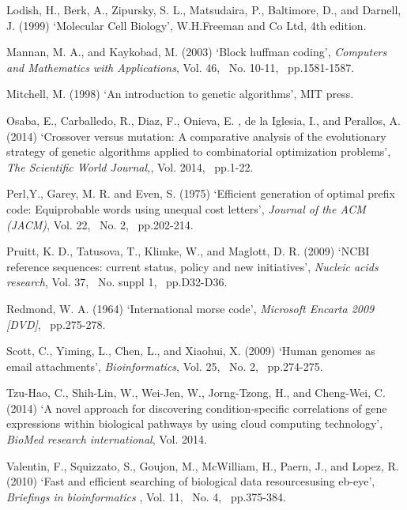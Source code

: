 \documentclass{singlecol-new}
\theoremstyle{TH}{
\newtheorem{lemma}{Lemma}
\newtheorem{theorem}[lemma]{Theorem}
\newtheorem{corrolary}[lemma]{Corrolary}
\newtheorem{conjecture}[lemma]{Conjecture}
\newtheorem{proposition}[lemma]{Proposition}
\newtheorem{claim}[lemma]{Claim}
\newtheorem{stheorem}[lemma]{Wrong Theorem}
}
\theoremstyle{THrm}{
\newtheorem{definition}{Definition}
\newtheorem{question}{Question}
\newtheorem{remark}{Remark}
\newtheorem{scheme}{Scheme}
}
\theoremstyle{THhit}{
\newtheorem{case}{Case}[section]
}
\begin{document}
\begin{thebibliography}{99}
Lodish, H., Berk, A., Zipursky, S. L., Matsudaira, P.,   Baltimore, D., and  Darnell, J. (1999) `Molecular Cell Biology', W.H.Freeman and Co Ltd, 4th edition.

Mannan, M. A., and Kaykobad, M. (2003) `Block huffman coding', {\it Computers and Mathematics with Applications}, Vol. 46,~ No. 10-11,~ pp.1581-1587.

Mitchell, M. (1998) `An introduction to genetic algorithms', MIT press.

Osaba, E., Carballedo, R., Diaz, F., Onieva, E. ,
de la Iglesia, I., and  Perallos, A. (2014) `Crossover
versus mutation: A comparative analysis
of the evolutionary strategy of genetic algorithms applied to combinatorial optimization problems', {\it The Scientific World Journal,}, Vol. 2014,~ pp.1-22.


Perl,Y., Garey, M. R. and  Even, S. (1975) `Efficient generation of optimal prefix code: Equiprobable
words using unequal cost letters', {\it Journal of
the ACM (JACM)}, Vol. 22,~ No. 2,~ pp.202-214.

Pruitt, K. D., Tatusova, T., Klimke, W., and 
Maglott, D. R. (2009) `NCBI reference sequences: current
status, policy and new initiatives', {\it Nucleic
acids research}, Vol. 37,~ No. suppl 1,~ pp.D32-D36.

Redmond, W. A. (1964) `International morse code', {\it Microsoft Encarta 2009 [DVD]},~ 
pp.275-278.

Scott, C., Yiming, L., Chen,  L., and  Xiaohui, X. (2009) `Human genomes as email attachments', {\it Bioinformatics}, Vol. 25,~ No. 2,~ pp.274-275.

 Tzu-Hao, C., Shih-Lin, W., Wei-Jen, W.,
 Jorng-Tzong, H., and  Cheng-Wei, C. (2014) `A novel
approach for discovering condition-specific correlations of gene expressions within biological pathways by using cloud computing
technology', {\it BioMed research international}, Vol. 2014.

Valentin, F., Squizzato, S., Goujon,  M.,
McWilliam, H., Paern, J., and Lopez, R. (2010) `Fast and efficient searching of biological
data resourcesusing eb-eye', {\it  Briefings in
bioinformatics }, Vol. 11,~ No. 4,~ pp.375-384.


\end{thebibliography}
\end{document}
